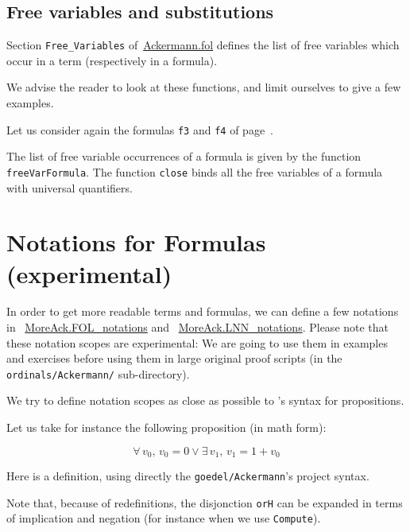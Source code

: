 \subsection{Free variables and substitutions}

Section \texttt{Free\_Variables} 
of~\href{../theories/html/hydras.Ackermann.fol.html}{Ackermann.fol} defines the list of free variables which occur in a term (respectively in a formula).

We advise the reader to look at these functions, and limit ourselves to give a few examples.

Let us consider again the formulas \texttt{f3} and \texttt{f4} of page~\pageref{fol:examplesf1f2f3}.

The list of free variable occurrences of a formula is given by the function \texttt{freeVarFormula}. The function \texttt{close}
binds all the free variables of a formula with universal quantifiers.









\section{Notations for Formulas (experimental)}

In order to get more readable terms and formulas, we can define a few notations in ~\href{../theories/html/hydras.MoreAck.FOL_notations.html}{MoreAck.FOL\_notations} and
~\href{../theories/html/hydras.MoreAck.LNN_notations.html}{MoreAck.LNN\_notations}.
Please note that these notation scopes are experimental: We are going to use them in examples and exercises before using them in large original proof scripts (in the \texttt{ordinals/Ackermann/} sub-directory).

We try to define notation scopes as close as possible to \coq's syntax for propositions.

Let us take for instance the following proposition (in math form):

$$\forall\, v_0,\, v_0=0\vee \exists\,v_1,\,v_1=1+v_0$$

Here is a definition, using directly the \texttt{goedel/Ackermann}'s project syntax.


Note that, because of redefinitions, the disjonction \texttt{orH}
can be expanded in terms of  implication and negation (for instance when we use \texttt{Compute}).

